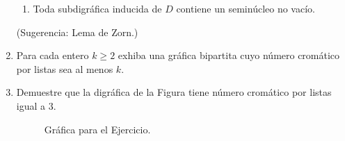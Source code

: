 \documentclass{article}
\begin{document}
\begin{enumerate}
\begin{enumerate}
      \item Toda subdigr\'afica inducida de $D$ contiene un semin\'ucleo no
        vac\'io.
    \end{enumerate}
    (Sugerencia: Lema de Zorn.)

  \item Para cada entero $k \ge 2$ exhiba una gr\'afica bipartita cuyo
    n\'umero crom\'atico por listas sea al menos $k$.

  \item Demuestre que la digr\'afica de la Figura tiene
    n\'umero crom\'atico por listas igual a $3$.
    \begin{figure}[ht!]
    \centering
    \caption{Gr\'afica para el Ejercicio.}
    \end{figure}
\end{enumerate}
\end{document}
